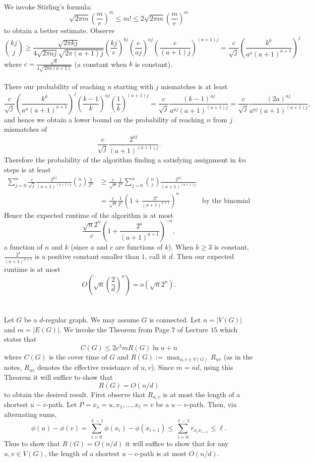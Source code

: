\documentclass[letterpaper,12pt,oneside,onecolumn]{article}
\begin{document}
	\paragraph{}
	We invoke Stirling's formula:
	$$\sqrt{2\pi m}(\frac{m}{e})^m \leq m! \leq 2\sqrt{2\pi m}(\frac{m}{e})^m$$
	to obtain a better estimate. Observe
	$${kj\choose j} \geq \frac{\sqrt{2\pi kj}}{4\sqrt{2\pi aj}\sqrt{2\pi (a+1)j}}(\frac{kj}{e})^{kj}(\frac{e}{aj})^{aj}(\frac{e}{(a+1)j})^{(a+1)j} = \frac{c}{\sqrt{j}}(\frac{k^k}{a^a(a+1)^{a+1}})^j$$
	where $c = \frac{\sqrt{k}}{4\sqrt{2\pi a(a+1)}}$ (a constant when $k$ is constant).
	\paragraph{}
	There our probability of reaching $n$ starting with $j$ mismatches is at least
	$$\frac{c}{\sqrt{j}}(\frac{k^k}{a^a(a+1)^{a+1}})^j(\frac{k-1}{k})^{aj}(\frac{1}{k})^{(a+1)j} = \frac{c}{\sqrt{j}}\frac{(k-1)^{aj}}{a^{aj}(a+1)^{(a+1)j}} = \frac{c}{\sqrt{j}}\frac{(2a)^{aj}}{a^{aj}(a+1)^{(a+1)j}},$$
	and hence we obtain a lower bound on the probability of reaching $n$ from $j$ mismatches of
	$$\frac{c}{\sqrt{j}}\frac{2^{aj}}{(a+1)^{(a+1)j}}.$$
	Therefore the probability of the algorithm finding a satisfying assignment in $kn$ steps is at least
	\begin{align*}
	\sum_{j=0}^n\frac{c}{\sqrt{j}}\frac{2^{aj}}{(a+1)^{(a+1)j}} {n\choose j}\frac{1}{2^n} &\geq \frac{c}{\sqrt{n}}\frac{1}{2^n}\sum_{j=0}^n{n\choose j}\frac{2^{aj}}{(a+1)^{(a+1)j}} \\
	&=\frac{c}{\sqrt{n}}\frac{1}{2^n}(1+\frac{2^a}{(a+1)^{a+1}})^n &\text{by the binomial theorem}
	\end{align*}
	Hence the expected runtime of the algorithm is at most
	$$\frac{\sqrt{n}2^n}{c}(1+\frac{2^a}{(a+1)^{a+1}})^{-n},$$
	a function of $n$ and $k$ (since $a$ and $c$ are functions of $k$). When $k\geq 3$ is constant, $\frac{2^a}{(a+1)^{a+1}}$ is a positive constant smaller than $1$, call it $d$. Then our expected runtime is at most
	$$O(\sqrt{n}(\frac{2}{d})^n) = o(\sqrt{n}2^n).$$
	\newpage
	\section{}
	Let $G$ be a $d$-regular graph. We may assume $G$ is connected. Let $n = |V(G)|$ and $m = |E(G)|$. We invoke the Theorem from Page $7$ of Lecture $15$ which states that 
	$$C(G) \leq 2e^3mR(G)\ln n + n$$
	where $C(G)$ is the cover time of $G$ and $R(G):=\max_{u,v\in V(G)} R_{uv}$ (as in the notes, $R_{uv}$ denotes the effective resistance of $u,v$). Since $m = nd$, using this Theorem it will suffice to show that
	$$R(G) = O(n/d)$$
	to obtain the desired result. First observe that $R_{u,v}$ is at most the length of a shortest $u-v$-path. Let $P=x_o=u, x_1, \dots, x_\ell=v$ be a $u-v$-path. Then, via alternating sums,
	$$\phi(u) - \phi(v) = \sum_{i=0}^{\ell-1} \phi(x_i) -\phi(x_{i+1}) \leq \sum_{i=0}^{\ell-1}r_{x_ix_{i+1}} \leq \ell.$$
	Thus to show that $R(G) = O(n/d)$ it will suffice to show that for any $u,v \in V(G)$, the length of a shortest $u-v$-path is at most $O(n/d)$.
\end{document}
